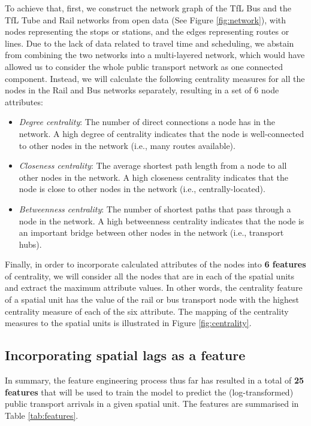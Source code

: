 To achieve that, first, we construct the network graph of the TfL Bus and the TfL Tube and Rail networks from open data (See Figure \ref{fig:network}), with nodes representing the stops or stations, and the edges representing routes or lines. Due to the lack of data related to travel time and scheduling, we abstain from combining the two networks into a multi-layered network, which would have allowed us to consider the whole public transport network as one connected component. Instead, we will calculate the following centrality measures for all the nodes in the Rail and Bus networks separately, resulting in a set of 6 node attributes:

\pagebreak[4] %
\begin{itemize}
    \setlength\itemsep{0em}
    \item \textit{Degree centrality}: The number of direct connections a node has in the network. A high degree of centrality indicates that the node is well-connected to other nodes in the network (i.e., many routes available).
    \item \textit{Closeness centrality}: The average shortest path length from a node to all other nodes in the network. A high closeness centrality indicates that the node is close to other nodes in the network (i.e., centrally-located). 
    \item \textit{Betweenness centrality}: The number of shortest paths that pass through a node in the network. A high betweenness centrality indicates that the node is an important bridge between other nodes in the network (i.e., transport hubs).
\end{itemize}

Finally, in order to incorporate calculated attributes of the nodes into \textbf{6 features} of centrality, we will consider all the nodes that are in each of the spatial units and extract the maximum attribute values. In other words, the centrality feature of a spatial unit has the value of the rail or bus transport node with the highest centrality measure of each of the six attribute. The mapping of the centrality measures to the spatial units is illustrated in Figure \ref{fig:centrality}.

\subsection{Incorporating spatial lags as a feature}

In summary, the feature engineering process thus far has resulted in a total of \textbf{25 features} that will be used to train the model to predict the (log-transformed) public transport arrivals in a given spatial unit. The features are summarised in Table \ref{tab:features}.

